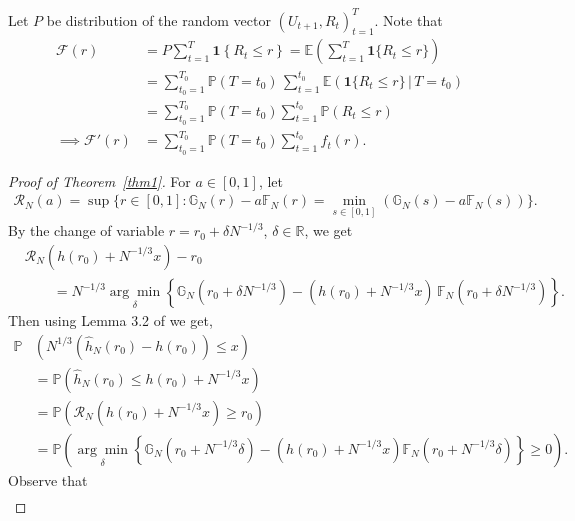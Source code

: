 \documentclass[12pt]{amsart}
\theoremstyle{plain}
\theoremstyle{remark}
\numberwithin{equation}{section}
\begin{document}
Let $P$ be distribution of the random vector $\left(U_{t+1},R_{t}\right)_{t=1}^{T}$.
Note that 
\begin{align*}
\mathcal{F}(r)&=P\sum_{t=1}^{T} \mathbf{1}\left\{R_t \leq r\right\}
    = \mathbb{E}\!\left( \sum_{t=1}^{T} \mathbf{1}\{R_t \le r\} \right) \\
    &= \sum_{t_0=1}^{T_0} \mathbb{P}(T = t_0)\,
         \sum_{t=1}^{t_0} \mathbb{E}\!\left(\mathbf{1}\{R_t \le r\} \,\big|\, T = t_0 \right) \\
    &= \sum_{t_0=1}^{T_0} \mathbb{P}(T = t_0)
        \sum_{t=1}^{t_0} \mathbb{P}\!\left( R_t \le r \right) \\
\implies \mathcal{F}'(r)
    &= \sum_{t_0=1}^{T_0} \mathbb{P}(T = t_0)
      \sum_{t=1}^{t_0}f_t(r).
\end{align*}
\begin{proof}[Proof of Theorem~\ref{thm1}] 
For $a \in [0,1]$, let 
\begin{align}\label{eq:rN1}
   \mathcal{R}_N(a) = \sup\{r \in \left[0, 1\right] : \mathbb{G}_{N}(r)-a \mathbb{F}_{N}(r) = \min_{s \in \left[0, 1\right]} (\mathbb{G}_{N}(s)-a \mathbb{F}_{N}(s))\}.
\end{align}
By the change of variable $r = r_0 + \delta N^{-1/3}$, $\delta \in \mathbb{R}$, we get
\begin{align}\label{eq:rN2}
&\mathcal{R}_N(h(r_0) + N^{-1/3} x) - r_0 \nonumber
\\ &\qquad =
N^{-1/3} \underset{\delta}{\operatorname{arg}\operatorname{min}}
\left\{
\mathbb{G}_{N}\left(r_0 + \delta N^{-1/3}\right)
-
\left(h(r_0) + N^{-1/3} x\right)\, \mathbb{F}_{N}\left(r_0 + \delta N^{-1/3}\right)
\right\}.
\end{align}
Then using Lemma 3.2 of \cite{MR3445293} we get, 
\begin{align}\label{eq0}
\mathbb{P}&\left(N^{1/3}\left(\hat{h}_{N}\left(r_{0}\right)-h\left(r_{0}\right)\right) \leq x\right) \nonumber
\\ &=\mathbb{P}\left(\hat{h}_{N}\left(r_{0}\right)\leq h(r_0) + N^{-1/3} x\right) \nonumber
\\ &= \mathbb{P}\left(\mathcal{R}_N(h(r_0) + N^{-1/3} x) \geq r_0\right) \nonumber
\\ & =\mathbb{P}\left(\underset{\delta}{\operatorname{arg}\operatorname{min}} \left\{\mathbb{G}_{N}\left(r_{0}+N^{-1/3} 
\delta\right)-\left(h\left(r_{0}\right)+N^{-1/3}x\right)\mathbb{F}_{N}\left(r_{0}+N^{-1/3}\delta\right)\right\} \geq 0\right).
\end{align}
Observe that
\begin{align*}

\end{align*}
\end{proof}
\end{document}
